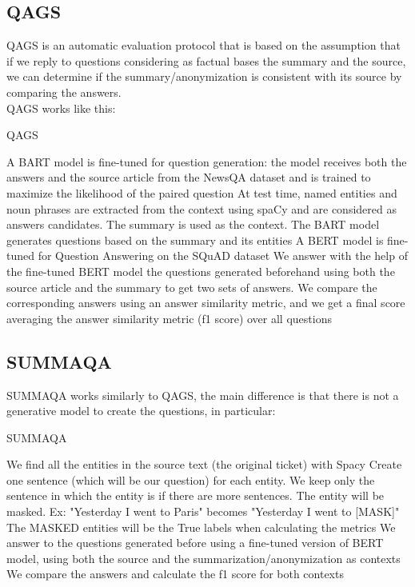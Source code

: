 \subsection*{QAGS}
QAGS is an automatic evaluation protocol that is based on the assumption that if we reply to questions considering as factual bases the summary and the source, we can determine if the summary/anonymization is consistent with its source by comparing the answers. \\
QAGS works like this:
\begin{algorithm}
    \caption*{QAGS}
    \begin{algorithmic}[1]
      \State A BART model is fine-tuned for question generation: the model receives both the answers and the source article from the NewsQA dataset and is trained to maximize the likelihood of the paired question
      \State At test time, named entities and noun phrases are extracted from the context using spaCy and are considered as answers candidates. The summary is used as the context.
      \State The BART model generates questions based on the summary and its entities
      \State A BERT model is fine-tuned for Question Answering on the SQuAD dataset
      \State We answer with the help of the fine-tuned BERT model the questions generated beforehand using both the source article and the summary to get two sets of answers. 
      \State We compare the corresponding answers using an answer similarity metric, and we get a final score averaging the answer similarity metric (f1 score) over all questions
    \end{algorithmic}
\end{algorithm}

\subsection*{SUMMAQA}
SUMMAQA works similarly to QAGS, the main difference is that there is not a generative model to create the questions, in particular:
\begin{algorithm}
    \caption*{SUMMAQA}
    \begin{algorithmic}[1]
      \State We find all the entities in the source text (the original ticket) with Spacy
      \State Create one sentence (which will be our question) for each entity. We keep only the sentence in which the entity is if there are more sentences. The entity will be masked. Ex: "Yesterday I went to Paris" becomes "Yesterday I went to [MASK]"
      \State The MASKED entities will be the True labels when calculating the metrics
      \State We answer to the questions generated before using a fine-tuned version of BERT model, using both the source and the summarization/anonymization as contexts
      \State We compare the answers and calculate the f1 score for both contexts
    \end{algorithmic}
\end{algorithm}
